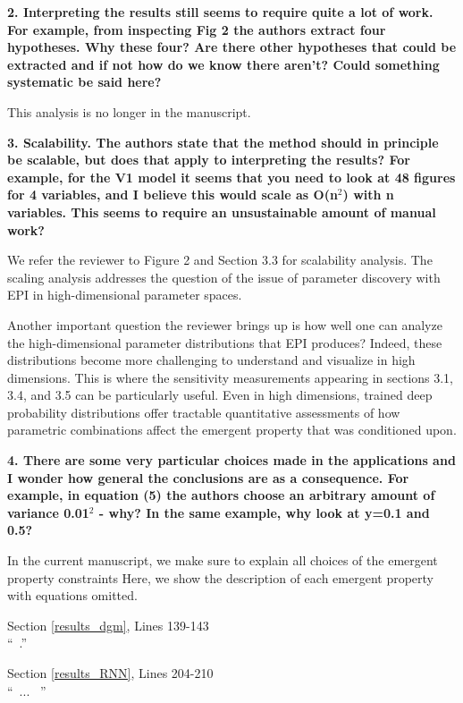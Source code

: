 \documentclass[11pt,a4paper]{article}
\begin{document}
\textbf{2. Interpreting the results still seems to require quite a lot of work. For example, from inspecting Fig 2 the authors extract four hypotheses. Why these four? Are there other hypotheses that could be extracted and if not how do we know there aren't? Could something systematic be said here? }

This analysis is no longer in the manuscript.

\textbf{3. Scalability. The authors state that the method should in principle be scalable, but does that apply to interpreting the results? For example, for the V1 model it seems that you need to look at 48 figures for 4 variables, and I believe this would scale as O(n$^2$) with n variables. This seems to require an unsustainable amount of manual work?}

We refer the reviewer to Figure 2 and Section 3.3 for scalability analysis.  The scaling analysis addresses the question of the issue of parameter discovery with EPI in high-dimensional parameter spaces.

Another important question the reviewer brings up is how well one can analyze the high-dimensional parameter distributions that EPI produces?  
Indeed, these distributions become more challenging to understand and visualize in high dimensions.  
This is where the sensitivity measurements appearing in sections 3.1, 3.4, and 3.5 can be particularly useful.  
Even in high dimensions, trained deep probability distributions offer tractable quantitative assessments of how parametric combinations affect the emergent property that was conditioned upon.

\textbf{4. There are some very particular choices made in the applications and I wonder how general the conclusions are as a consequence. For example, in equation (5) the authors choose an arbitrary amount of variance 0.01$^2$ - why? In the same example, why look at y=0.1 and 0.5? }

In the current manuscript, we make sure to explain all choices of the emergent property constraints  Here, we show the description of each emergent property with equations omitted.

\begin{displayquote}
Section \ref{results_dgm}, Lines 139-143\\
``~.''
\end{displayquote}

\begin{displayquote}
Section \ref{results_RNN}, Lines 204-210\\
``~... ~''
\end{displayquote}
\end{document}
